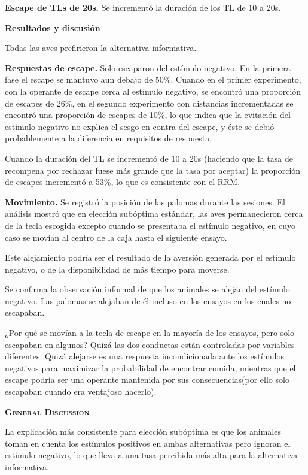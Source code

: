 \documentclass[a4paper,12pt]{article}
\begin{document}
{\bfseries Escape de TLs de 20s.} Se incrementó la duración de los TL de 10 a 20s. 

{\bfseries Resultados y discusión}

Todas las aves prefirieron la alternativa informativa.

{\bfseries Respuestas de escape.} Solo escaparon del estímulo negativo. En la primera fase el escape se mantuvo aun debajo de 50\%. Cuando en el primer experimento, con la operante de escape cerca al estímulo negativo, se encontró una proporción de escapes de 26\%, en el segundo experimento con distancias incrementadas se encontró una proporción de escapes de 10\%, lo que indica que la evitación del estímulo negativo no explica el sesgo en contra del escape, y éste se debió probablemente a la diferencia en requisitos de respuesta.

Cuando la duración del TL se incrementó de 10 a 20s (haciendo que la tasa de recompena por rechazar fuese más grande que la tasa por aceptar) la proporción de escapes incrementó a 53\%, lo que es consistente con el RRM.

{\bfseries Movimiento.} Se registró la posición de las palomas durante las sesiones. El análisis mostró que en elección subóptima estándar, las aves permanecieron cerca de la tecla escogida excepto cuando se presentaba el estímulo  negativo, en cuyo caso se movían al centro de la caja hasta el siguiente ensayo.

Este alejamiento podría ser el resultado de la aversión generada por el estímulo negativo, o de la disponibilidad de más tiempo para moverse.

Se confirma la observación informal de que los animales se alejan del estímulo negativo. Las palomas se alejaban de él incluso en los ensayos en los cuales no escapaban.

¿Por qué se movían a la tecla de escape en la mayoría de los ensayos, pero solo escapaban en algunos? Quizá las dos conductas están controladas por variables diferentes. Quizá alejarse es una respuesta incondicionada ante los estímulos negativos para maximizar la probabilidad de encontrar comida, mientras que el escape podría ser una operante mantenida por sus consecuencias(por ello solo escapaban cuando era ventajoso hacerlo).

{\scshape\bfseries General Discussion}

La explicación más consistente para elección subóptima es que los animales toman en cuenta los estímulos positivos en ambas alternativas pero ignoran el estímulo negativo, lo que lleva a una tasa percibida más alta para la alternativa informativa.
\end{document}
